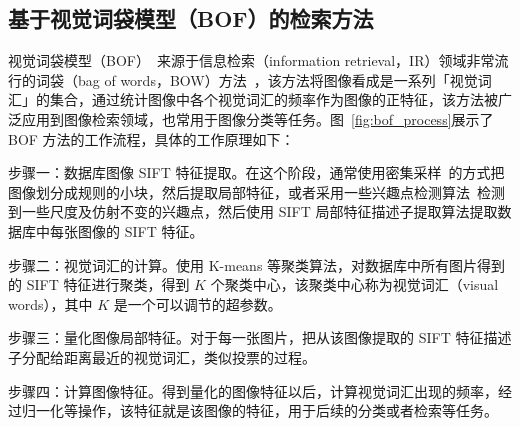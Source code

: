\subsection{基于视觉词袋模型（BOF）的检索方法}
视觉词袋模型（BOF）~\cite{OHara2011IntroductionTT,Nowak2006SamplingSF,Yang2007EvaluatingBR}来源于信息检索（information retrieval，IR）领域非常流行的词袋（bag of words，BOW）方法~\cite{manning2008introduction,Salton1975AVS}，该方法将图像看成是一系列「视觉词汇」的集合，通过统计图像中各个视觉词汇的频率作为图像的正特征，该方法被广泛应用到图像检索领域，也常用于图像分类等任务。图~\ref{fig:bof_process}展示了 BOF 方法的工作流程，具体的工作原理如下：

步骤一：数据库图像 SIFT 特征提取。在这个阶段，通常使用密集采样~\cite{Vogel2004NaturalSR,FeiFei2005ABH}的方式把图像划分成规则的小块，然后提取局部特征，或者采用一些兴趣点检测算法~\cite{Mikolajczyk2004ScaleA}检测到一些尺度及仿射不变的兴趣点，然后使用 SIFT 局部特征描述子提取算法提取数据库中每张图像的 SIFT 特征。

步骤二：视觉词汇的计算。使用 K-means 等聚类算法，对数据库中所有图片得到的 SIFT 特征进行聚类，得到 $K$ 个聚类中心，该聚类中心称为视觉词汇（visual words），其中 $K$ 是一个可以调节的超参数。

步骤三：量化图像局部特征。对于每一张图片，把从该图像提取的 SIFT 特征描述子分配给距离最近的视觉词汇，类似投票的过程。

步骤四：计算图像特征。得到量化的图像特征以后，计算视觉词汇出现的频率，经过归一化等操作，该特征就是该图像的特征，用于后续的分类或者检索等任务。

